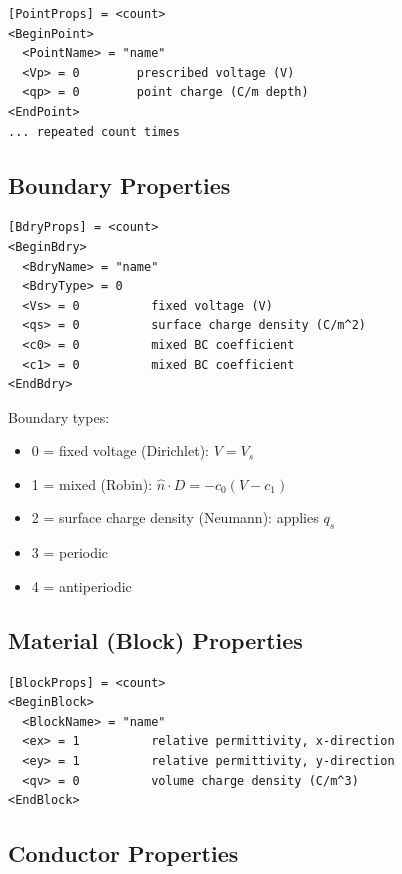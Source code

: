 \documentclass[11pt]{article}
\begin{document}
\begin{lstlisting}
[PointProps] = <count>
<BeginPoint>
  <PointName> = "name"
  <Vp> = 0        prescribed voltage (V)
  <qp> = 0        point charge (C/m depth)
<EndPoint>
... repeated count times
\end{lstlisting}

\subsection{Boundary Properties}

\begin{lstlisting}
[BdryProps] = <count>
<BeginBdry>
  <BdryName> = "name"
  <BdryType> = 0
  <Vs> = 0          fixed voltage (V)
  <qs> = 0          surface charge density (C/m^2)
  <c0> = 0          mixed BC coefficient
  <c1> = 0          mixed BC coefficient
<EndBdry>
\end{lstlisting}

Boundary types:
\begin{itemize}[nosep]
  \item 0 = fixed voltage (Dirichlet): $V = V_s$
  \item 1 = mixed (Robin): $\hat{n} \cdot D = -c_0 (V - c_1)$
  \item 2 = surface charge density (Neumann): applies $q_s$
  \item 3 = periodic
  \item 4 = antiperiodic
\end{itemize}

\subsection{Material (Block) Properties}

\begin{lstlisting}
[BlockProps] = <count>
<BeginBlock>
  <BlockName> = "name"
  <ex> = 1          relative permittivity, x-direction
  <ey> = 1          relative permittivity, y-direction
  <qv> = 0          volume charge density (C/m^3)
<EndBlock>
\end{lstlisting}

\subsection{Conductor Properties}
\end{document}
